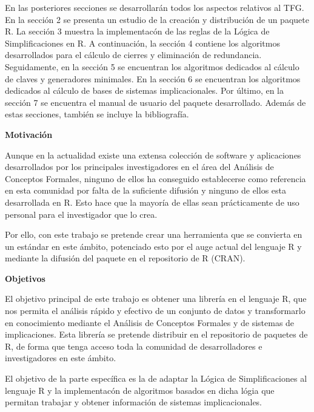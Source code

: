 En las posteriores secciones se desarrollar\'an todos los aspectos relativos al TFG. En la secci\'on 2 se presenta un estudio de la creaci\'on y distribuci\'on de un paquete R. La secci\'on 3 muestra la implementac\'on de las reglas de la L\'ogica de Simplificaciones en R. A continuaci\'on, la secci\'on 4 contiene los algoritmos desarrollados para el c\'alculo de cierres y eliminaci\'on de redundancia. Seguidamente, en la secci\'on 5 se encuentran los algoritmos dedicados al c\'alculo de claves y generadores minimales. En la secci\'on 6 se encuentran los algoritmos dedicados al c\'alculo de bases de sistemas implicacionales. Por \'ultimo, en la secci\'on 7 se encuentra el manual de usuario del paquete desarrollado. Adem\'as de estas secciones, tambi\'en se incluye la bibliograf\'ia.

\textbf{Motivaci\'on}

Aunque en la actualidad existe una extensa colecci\'on de software y aplicaciones desarrollados por los principales investigadores en el \'area del  An\'alisis de Conceptos Formales, ninguno de ellos ha conseguido establecerse como referencia en esta comunidad por falta de la suficiente difusi\'on y ninguno de ellos esta desarrollada en R. Esto hace que la mayor\'ia de ellas sean pr\'acticamente de uso personal para el investigador que lo crea. 

Por ello, con este trabajo se pretende crear una herramienta que se convierta en un est\'andar en este \'ambito, potenciado esto por el auge actual del lenguaje R y mediante la difusi\'on del paquete en el repositorio de R (CRAN).


\textbf{Objetivos}

El objetivo principal de este trabajo es obtener una librer\'ia en el lenguaje R, que nos permita el an\'alisis r\'apido y efectivo de un conjunto de datos y transformarlo en conocimiento mediante el An\'alisis de Conceptos Formales y de sistemas de implicaciones. Esta librer\'ia se pretende distribuir en el repositorio de paquetes de R, de forma que tenga acceso toda la comunidad de desarrolladores e investigadores en este \'ambito. 

El objetivo de la parte espec\'ifica es la de adaptar la L\'ogica de Simplificaciones al lenguaje R y la implementac\'on de algoritmos basados en dicha l\'ogia que permitan trabajar y obtener informaci\'on de sistemas implicacionales.

\newpage